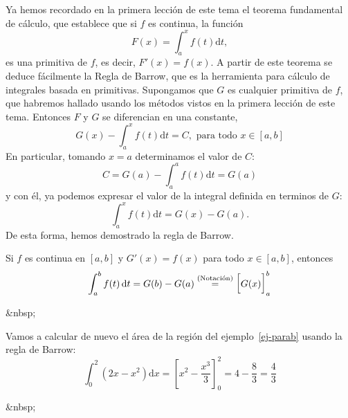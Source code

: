 Ya hemos recordado en la primera lección de este tema el teorema fundamental de cálculo, que establece que si $f$ es continua, la función
\[
F(x)=\int_a^x f(t)\mathrm dt,
\]
es una primitiva de $f$, es decir, $F'(x)=f(x)$.
A partir de este teorema se deduce fácilmente la Regla de Barrow, que es la herramienta para cálculo de integrales basada en primitivas.
Supongamos que $G$ es cualquier primitiva de $f$, que habremos hallado usando los métodos vistos en la primera lección de este tema.
Entonces $F$ y $G$ se diferencian en una constante,
\begin{equation}\label{eq:barrow1}
G(x)-\int_a^x f(t)\mathrm dt = C, \text{ para todo } x\in[a,b]
\end{equation}
En particular, tomando $x=a$ determinamos el valor de $C$:
\[
C=G(a)-\int_a^a f(t)\mathrm dt = G(a)
\]
y con él, ya podemos expresar el valor de la integral definida en terminos de $G$:
\[
\int_a^x f(t)\mathrm dt = G(x)-G(a).
\]
De esta forma, hemos demostrado la regla de Barrow.
%
\begin{teorema}\label{th:barrow}
Si $f$ es continua en $[a,b]$ y $G'(x)=f(x)$ para todo $x\in[a,b]$, entonces 
\[ 
\int_a^b f(t)\,\mathrm dt=G(b)-G(a) \stackrel{\text{(Notación)}}{=} \left[G(x)\vphantom{\dfrac12}\right]_a^b
\]
\end{teorema}
\begin{rawhtml}
&nbsp;
\end{rawhtml}
\begin{ejemplo}
Vamos a calcular de nuevo el área de la región del ejemplo~\ref{ej-parab} usando la regla de Barrow:
\begin{equation}
\int_0^2 (2x-x^2)\mathrm dx = \left[x^2-\frac{x^3}3\right]_0^2 = 4-\frac83=\frac43\tag*{\fej}
\end{equation}
\end{ejemplo}
\begin{rawhtml}
&nbsp;
\end{rawhtml}
